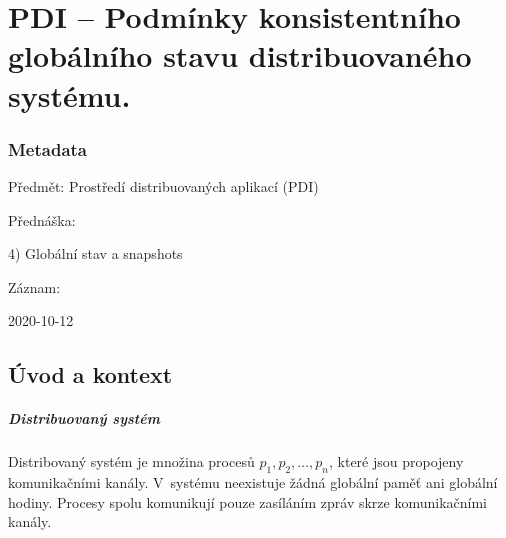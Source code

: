 

\graphicspath{{pdi/konzistentni_globalni_stav}}


\chapter{PDI -- Podmínky konsistentního globálního stavu distribuovaného systému.}



\subsection{Metadata}

\begin{compactitem}
    \item Předmět: Prostředí distribuovaných aplikací (PDI)
    \item Přednáška:
    \begin{compactitem}
        \item 4) Globální stav a snapshots
    \end{compactitem}
    \item Záznam:
    \begin{compactitem}
        \item 2020-10-12
    \end{compactitem}
\end{compactitem}


\section{Úvod a kontext}

\paragraph*{Distribuovaný systém} Distribovaný systém je množina procesů $p_1, p_2, \dots, p_n$, které jsou propojeny komunikačními kanály. V~systému neexistuje žádná globální paměť ani globální hodiny. Procesy spolu komunikují pouze zasíláním zpráv skrze komunikačními kanály.

